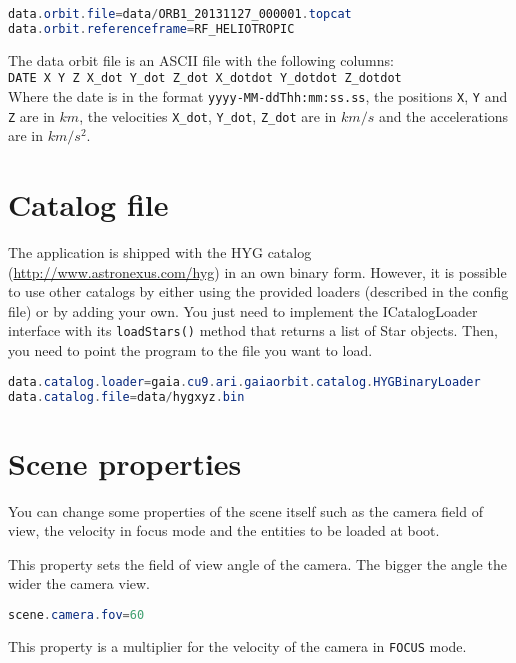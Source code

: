 \documentclass[
a4paper, %
11pt, %
onecolumn, %
openany, %
]{memoir}
\begin{document}
\begin{lstlisting}[language=Java]
data.orbit.file=data/ORB1_20131127_000001.topcat
data.orbit.referenceframe=RF_HELIOTROPIC
\end{lstlisting}

The data orbit file is an ASCII file with the following columns:\\

\texttt{DATE X Y Z X\_dot Y\_dot Z\_dot X\_dotdot Y\_dotdot Z\_dotdot}\\

Where the date is in the format \texttt{yyyy-MM-ddThh:mm:ss.ss}, the positions
\texttt{X}, \texttt{Y} and \texttt{Z} are in $km$, the velocities \texttt{X\_dot}, \texttt{Y\_dot}, \texttt{Z\_dot}
are in $km/s$ and the accelerations are in $km/s^2$.

\section{Catalog file}
The application is shipped with the HYG catalog (\href{http://www.astronexus.com/hyg}{http://www.astronexus.com/hyg})
in an own binary form. However, it is possible to use other catalogs by either
using the provided loaders (described in the config file) or by adding your
own. You just need to implement the ICatalogLoader interface with its
\texttt{loadStars()} method that returns a list of Star objects.
Then, you need to point the program to the file you want to load.

\begin{lstlisting}[language=Java]
data.catalog.loader=gaia.cu9.ari.gaiaorbit.catalog.HYGBinaryLoader
data.catalog.file=data/hygxyz.bin
\end{lstlisting}

\section{Scene properties}
You can change some properties of the scene itself such as the camera field
of view, the velocity in focus mode and the entities to be loaded
at boot.

This property sets the field of view angle of the camera. The bigger the
angle the wider the camera view.

\begin{lstlisting}[language=Java]
scene.camera.fov=60
\end{lstlisting}

This property is a multiplier for the velocity of the camera in \texttt{FOCUS} mode.
\end{document}
